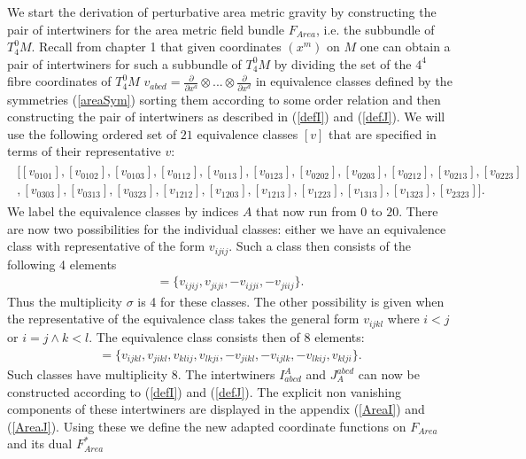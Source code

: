 \documentclass[a4paper,12pt, DIV=14, BCOR=5mm, twoside, headsepline]{scrbook}
\begin{document}
We start the derivation of perturbative area metric gravity by constructing the pair of intertwiners for the area metric field bundle $F_{Area}$, i.e. the subbundle of $T^0_4M$. Recall from chapter 1 that given coordinates $(x^m)$ on $M$ one can obtain a pair of intertwiners for such a subbundle of $T^0_4M$ by dividing the set of the $4^4$ fibre coordinates of $T^0_4M$ $v_{abcd}=\frac{\partial}{\partial x^a} \otimes ... \otimes \frac{\partial}{\partial x^d}$ in equivalence classes defined by the symmetries (\ref{areaSym}) sorting them according to some order relation and then constructing the pair of intertwiners as described in (\ref{defI}) and (\ref{defJ}). We will use the following ordered set of $21$ equivalence classes $[v]$ that are specified in terms of their representative $v$:
\begin{align}
\begin{aligned}
    \bigl [ [v_{0101}], [v_{0102}], [v_{0103}], [v_{0112}], [v_{0113}], [v_{0123}], [v_{0202}], [v_{0203}], [v_{0212}], [v_{0213}], [v_{0223}]\\
    , [v_{0303}], [v_{0313}], [v_{0323}], [v_{1212}], [v_{1203}], [v_{1213}], [v_{1223}], [v_{1313}], [v_{1323}], [v_{2323}]  \bigr ].
\end{aligned}
\end{align}
We label the equivalence classes by indices $A$ that now run from $0$ to $20$.
There are now two possibilities for the individual classes: either we have an equivalence class with representative of the form $v_{ijij}$. Such a class then consists of the following 4 elements
\begin{align}
    [v_{ijij}] = \{ v_{ijij}, v_{jiji}, -v_{ijji}, -v_{jiij} \}.
\end{align}
Thus the multiplicity $\sigma$ is 4 for these classes.
The other possibility is given when the representative of the equivalence class takes the general form $v_{ijkl}$ where $i<j$ or $i=j \land k<l$. The equivalence class consists then of 8 elements:
\begin{align}
    [v_{ijkl}] = \{v_{ijkl},v_{jikl}, v_{klij}, v_{lkji}, -v_{jikl}, -v_{ijlk}, -v_{lkij}, v_{klji} \}.
\end{align}
Such classes have multiplicity 8. The intertwiners $I^A_{abcd}$ and $J_A^{abcd}$ can now be constructed according to (\ref{defI}) and (\ref{defJ}). The explicit non vanishing components of these intertwiners are displayed in the appendix (\ref{AreaI}) and (\ref{AreaJ}). Using these we define the new adapted coordinate functions on $F_{Area}$ and its dual $F_{Area}^{\ast}$
\end{document}
